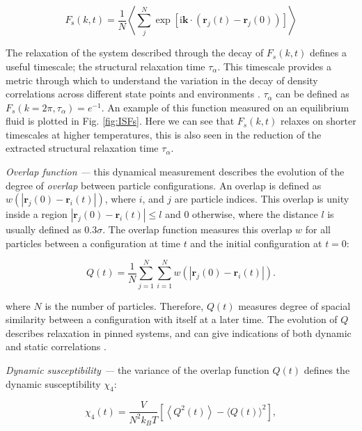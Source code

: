 \begin{equation}
  	F_{\mathrm{s}}(k, t)=\frac{1}{N}\left\langle\sum_{j}^{N} \exp \left[\mathrm{i} \mathbf{k} \cdot\left(\mathbf{r}_{j}(t)-\mathbf{r}_{j}(0)\right)\right]\right\rangle
\end{equation}


\noindent The relaxation of the system described through the decay of $F_s(k,t)$ defines a useful timescale; the structural relaxation time $\tau_{\alpha}$. This timescale provides a metric through which to understand the variation in the decay of density correlations across different state points and environments \cite{hansen2006}.
$\tau_{\alpha}$ can be defined as $F_s(k = 2\pi, \tau_{\alpha}) = e^{-1}$. An example of this function measured on an equilibrium fluid is plotted in Fig. \ref{fig:ISFs}. Here we can see that $F_s(k,t)$ relaxes on shorter timescales at higher temperatures, this is also seen in the reduction of the extracted structural relaxation time $\tau_\alpha$.



\textit{Overlap function ---} this dynamical measurement describes the evolution of the degree of \textit{overlap} between particle configurations. An overlap is defined as $w\left(\left|\mathbf{r}_{j}(0)-\mathbf{r}_{i}(t)\right|\right)$, where $i$, and $j$ are particle indices. This overlap is unity inside a region  $\left|\mathbf{r}_{j}(0)-\mathbf{r}_{i}(t)\right| \leq l$ and $0$ otherwise, where the distance $l$ is usually defined as $0.3 \sigma$. The overlap function measures this overlap $w$ for all particles between a configuration at time $t$ and the initial configuration at $t=0$: 


\begin{equation}	
	Q(t)=\frac{1}{N} \sum_{j=1}^{N} \sum_{i=1}^{N} w\left(\left|\mathbf{r}_{j}(0)-\mathbf{r}_{i}(t)\right|\right).
	\label{eq:Overlap}
\end{equation}

\noindent where $N$ is the number of particles. Therefore, $Q(t)$ measures degree of spacial similarity between a configuration with itself at a later time. The evolution of $Q$ describes relaxation in pinned systems, and can give indications of both dynamic and static correlations \cite{szamel2013}. 




\textit{Dynamic susceptibility ---} the variance of the overlap function $Q(t)$ defines the dynamic susceptibility $\chi_4$:

\begin{equation}
	\chi_{4}(t)=\frac{V}{N^{2} k_{B} T}\left[\left\langle Q^{2}(t)\right\rangle-\langle Q(t)\rangle^{2}\right],
	\label{eq:chi4}
\end{equation}

